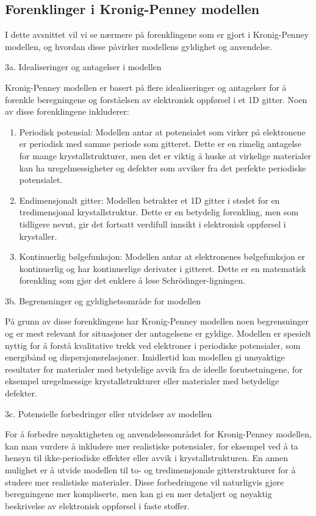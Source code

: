 \subsection*{Forenklinger i Kronig-Penney modellen}
I dette avsnittet vil vi se nærmere på forenklingene som er gjort i Kronig-Penney modellen, og hvordan disse påvirker modellens gyldighet og anvendelse.

3a. Idealiseringer og antagelser i modellen

Kronig-Penney modellen er basert på flere idealiseringer og antagelser for å forenkle beregningene og forståelsen av elektronisk oppførsel i et 1D gitter. Noen av disse forenklingene inkluderer:

\begin{enumerate}
    \item Periodisk potensial: Modellen antar at potensialet som virker på elektronene er periodisk med samme periode som gitteret. Dette er en rimelig antagelse for mange krystallstrukturer, men det er viktig å huske at virkelige materialer kan ha uregelmessigheter og defekter som avviker fra det perfekte periodiske potensialet.
    \item Endimensjonalt gitter: Modellen betrakter et 1D gitter i stedet for en tredimensjonal krystallstruktur. Dette er en betydelig forenkling, men som tidligere nevnt, gir det fortsatt verdifull innsikt i elektronisk oppførsel i krystaller.
    \item Kontinuerlig bølgefunksjon: Modellen antar at elektronenes bølgefunksjon er kontinuerlig og har kontinuerlige derivater i gitteret. Dette er en matematisk forenkling som gjør det enklere å løse Schrödinger-ligningen.
\end{enumerate}



3b. Begrensninger og gyldighetsområde for modellen

På grunn av disse forenklingene har Kronig-Penney modellen noen begrensninger og er mest relevant for situasjoner der antagelsene er gyldige. Modellen er spesielt nyttig for å forstå kvalitative trekk ved elektroner i periodiske potensialer, som energibånd og dispersjonsrelasjoner. Imidlertid kan modellen gi unøyaktige resultater for materialer med betydelige avvik fra de ideelle forutsetningene, for eksempel uregelmessige krystallstrukturer eller materialer med betydelige defekter.

3c. Potensielle forbedringer eller utvidelser av modellen

For å forbedre nøyaktigheten og anvendelsesområdet for Kronig-Penney modellen, kan man vurdere å inkludere mer realistiske potensialer, for eksempel ved å ta hensyn til ikke-periodiske effekter eller avvik i krystallstrukturen. En annen mulighet er å utvide modellen til to- og tredimensjonale gitterstrukturer for å studere mer realistiske materialer. Disse forbedringene vil naturligvis gjøre beregningene mer kompliserte, men kan gi en mer detaljert og nøyaktig beskrivelse av elektronisk oppførsel i faste stoffer.

